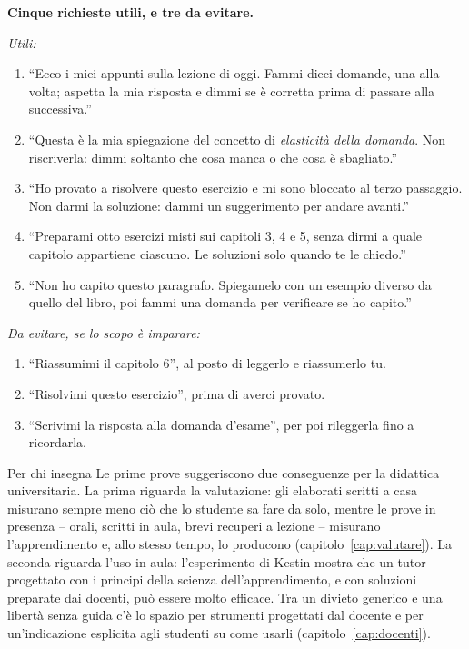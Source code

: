 \begin{inpratica}
\textbf{Cinque richieste utili, e tre da evitare.}

\smallskip\noindent\emph{Utili:}
\begin{enumerate}
  \item \enquote{Ecco i miei appunti sulla lezione di oggi. Fammi dieci
        domande, una alla volta; aspetta la mia risposta e dimmi se è
        corretta prima di passare alla successiva.}
  \item \enquote{Questa è la mia spiegazione del concetto di
        \emph{elasticità della domanda}. Non riscriverla: dimmi soltanto
        che cosa manca o che cosa è sbagliato.}
  \item \enquote{Ho provato a risolvere questo esercizio e mi sono
        bloccato al terzo passaggio. Non darmi la soluzione: dammi un
        suggerimento per andare avanti.}
  \item \enquote{Preparami otto esercizi misti sui capitoli 3, 4 e 5,
        senza dirmi a quale capitolo appartiene ciascuno. Le soluzioni
        solo quando te le chiedo.}
  \item \enquote{Non ho capito questo paragrafo. Spiegamelo con un
        esempio diverso da quello del libro, poi fammi una domanda per
        verificare se ho capito.}
\end{enumerate}
\emph{Da evitare, se lo scopo è imparare:}
\begin{enumerate}
  \item \enquote{Riassumimi il capitolo 6}, al posto di leggerlo e
        riassumerlo tu.
  \item \enquote{Risolvimi questo esercizio}, prima di averci provato.
  \item \enquote{Scrivimi la risposta alla domanda d'esame}, per poi
        rileggerla fino a ricordarla.
\end{enumerate}
\end{inpratica}

\begin{riquadro}{Per chi insegna}
Le prime prove suggeriscono due conseguenze per la didattica
universitaria. La prima riguarda la valutazione: gli elaborati scritti
a casa misurano sempre meno ciò che lo studente sa fare da solo, mentre
le prove in presenza -- orali, scritti in aula, brevi recuperi a
lezione -- misurano l'apprendimento e, allo stesso tempo, lo producono
(capitolo~\ref{cap:valutare}). La seconda riguarda l'uso in aula:
l'esperimento di Kestin mostra che un tutor progettato con i principi
della scienza dell'apprendimento, e con soluzioni preparate dai docenti,
può essere molto efficace. Tra un divieto generico e una libertà senza
guida c'è lo spazio per strumenti progettati dal docente e per
un'indicazione esplicita agli studenti su come usarli
(capitolo~\ref{cap:docenti}).
\end{riquadro}

